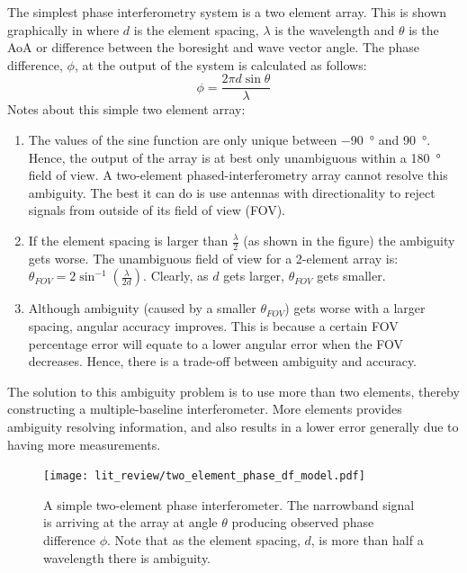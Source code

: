 The simplest phase interferometry system is a two element array. This is shown graphically in  where \(d\) is the element spacing, \(\lambda\) is the wavelength and \(\theta\) is the AoA or difference between the boresight and wave vector angle. The phase difference, \(\phi\), at the output of the system is calculated as follows:
\begin{equation}
\phi = \frac{2 \pi d \sin \theta}{\lambda}
\end{equation}
Notes about this simple two element array:
\begin{enumerate}
  \item The values of the sine function are only unique between \SI{-90}{\degree} and \SI{90}{\degree}. Hence, the output of the array is at best only unambiguous within a \SI{180}{\degree} field of view. A two-element phased-interferometry array cannot resolve this ambiguity. The best it can do is use antennas with directionality to reject signals from outside of its field of view (FOV).
  \item If the element spacing is larger than \(\frac{\lambda}{2}\) (as shown in the figure) the ambiguity gets worse. The unambiguous field of view for a 2-element array is: \(\theta_{FOV} = 2 \sin^{-1}(\frac{\lambda}{2d})\)\cite{poisel2012electronic}. Clearly, as \(d\) gets larger, \(\theta_{FOV}\) gets smaller. 
  \item Although ambiguity (caused by a smaller \(\theta_{FOV}\)) gets worse with a larger spacing, angular accuracy improves. This is because a certain FOV percentage error will equate to a lower angular error when the FOV decreases. Hence, there is a trade-off between ambiguity and accuracy.
\end{enumerate}
The solution to this ambiguity problem is to use more than two elements, thereby constructing a multiple-baseline interferometer. More elements provides ambiguity resolving information, and also results in a lower error generally due to having more measurements.\\

\begin{figure}
   \centering
   \texttt{[image: lit\_review/two\_element\_phase\_df\_model.pdf]}
   \caption{A simple two-element phase interferometer. The narrowband signal is arriving at the array at angle \(\theta\) producing observed phase difference \(\phi\). Note that as the element spacing, \(d\), is more than half a wavelength there is ambiguity.}
   \label{fig:lit-two-element-phase}
\end{figure}

